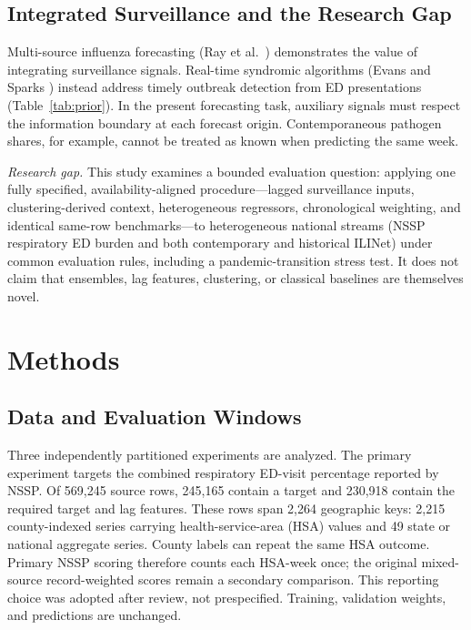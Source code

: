 \documentclass[conference,a4paper]{IEEEtran}
\begin{document}
\subsection{Integrated Surveillance and the Research Gap}
Multi-source influenza forecasting (Ray et al.\ \cite{ray}) demonstrates the value of integrating surveillance signals. Real-time syndromic algorithms (Evans and Sparks \cite{evans}) instead address timely outbreak detection from ED presentations (Table~\ref{tab:prior}). In the present forecasting task, auxiliary signals must respect the information boundary at each forecast origin. Contemporaneous pathogen shares, for example, cannot be treated as known when predicting the same week.

\textit{Research gap.} This study examines a bounded evaluation question: applying one fully specified, availability-aligned procedure---lagged surveillance inputs, clustering-derived context, heterogeneous regressors, chronological weighting, and identical same-row benchmarks---to heterogeneous national streams (NSSP respiratory ED burden and both contemporary and historical ILINet) under common evaluation rules, including a pandemic-transition stress test. It does not claim that ensembles, lag features, clustering, or classical baselines are themselves novel.

\begin{table}[t]

\end{table}

\section{Methods}
\subsection{Data and Evaluation Windows}
Three independently partitioned experiments are analyzed. The primary experiment targets the combined respiratory ED-visit percentage reported by NSSP. Of 569,245 source rows, 245,165 contain a target and 230,918 contain the required target and lag features. These rows span 2,264 geographic keys: 2,215 county-indexed series carrying health-service-area (HSA) values and 49 state or national aggregate series. County labels can repeat the same HSA outcome. Primary NSSP scoring therefore counts each HSA-week once; the original mixed-source record-weighted scores remain a secondary comparison. This reporting choice was adopted after review, not prespecified. Training, validation weights, and predictions are unchanged.
\end{document}
